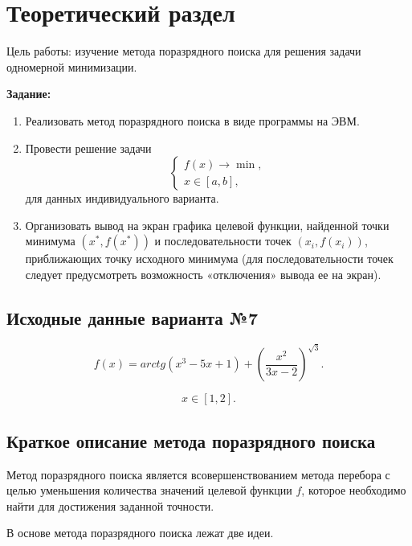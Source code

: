 \chapter{Теоретический раздел}

Цель работы: изучение метода поразрядного поиска для решения задачи одномерной минимизации.

\textbf{Задание:}
\begin{enumerate}
	\item Реализовать метод поразрядного поиска в виде программы на ЭВМ.
	\item Провести решение задачи 
	\begin{equation*}
		\begin{cases}
			f(x) \rightarrow \min, \\
			x \in [a, b],
		\end{cases}
	\end{equation*}
	для данных индивидуального варианта.
	\item Организовать вывод на экран графика целевой функции, найденной точки минимума $(x^{*}, f(x^{*}))$ и последовательности точек $(x_i, f(x_i))$, приближающих точку исходного минимума (для последовательности точек следует предусмотреть возможность «отключения» вывода ее на экран).
\end{enumerate}

\section{Исходные данные варианта №7}

\begin{equation*}
	f(x) = arctg(x^3 - 5x + 1) + \left( \frac{x^2}{3x - 2} \right)^{\sqrt{3}}.
\end{equation*}

\begin{equation*}
	x \in [1, 2].
\end{equation*}

\section{Краткое описание метода поразрядного поиска}

Метод поразрядного поиска является всовершенствованием метода перебора с целью уменьшения количества значений целевой функции $f$, которое необходимо найти для достижения заданной точности.

В основе метода поразрядного поиска лежат две идеи.

